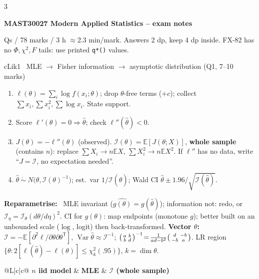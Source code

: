 \documentclass{article}
\newcommand{\h}[1]{{\bfseries #1}\ }
\newenvironment{steps}{\begin{enumerate}[label=\arabic*.,leftmargin=7pt,labelsep=1.2pt]}{\end{enumerate}}
\newcommand{\E}{\mathbb E}
\newcommand{\V}{\operatorname{Var}}
\newcommand{\I}{\mathcal I}
\newcommand{\tsp}{^{\mathsf T}}
\newcommand{\rc}[1]{\texttt{#1}}
\begin{document}
\fontsize{6.6}{7.15}\selectfont
\begin{multicols*}{3}

{\centering\bfseries\fontsize{7}{7.6}\selectfont MAST30027 Modern Applied Statistics -- exam notes\par}
{\centering\fontsize{5.6}{6.1} Qs / 78 marks / 3 h $\approx$2.3 min/mark. Answers 2 dp, keep 4 dp inside. FX-82 has no $\Phi,\chi^2,F$ tails: use printed \rc{q*()} values.\par}

\begin{tb}{cLik}{1 \textbullet\ MLE $\to$ Fisher information $\to$ asymptotic distribution (Q1, 7--10 marks)}
\begin{steps}
\item $\ell(\theta)=\sum_i\log f(x_i;\theta)$; drop $\theta$-free terms ($+c$); collect $\sum x_i,\sum x_i^2,\sum\log x_i$. State support.
\item Score $\ell'(\theta)=0\Rightarrow\hat\theta$; check $\ell''(\hat\theta)<0$.
\item $J(\theta)=-\ell''(\theta)$ (observed). $\I(\theta)=\E[J(\theta;X)]$, \textbf{whole sample} (contains $n$): replace $\sum X_i\to n\E X$, $\sum X_i^2\to n\E X^2$. If $\ell''$ has no data, write ``$J=\I$, no expectation needed''.
\item $\hat\theta\ \dot\sim\ N\big(\theta,\I(\theta)^{-1}\big)$; est.\ var $1/\I(\hat\theta)$; Wald CI $\hat\theta\pm1.96/\sqrt{\I(\hat\theta)}$.
\end{steps}
\h{Reparametrise:} MLE invariant ($\widehat{g(\theta)}=g(\hat\theta)$); information not: redo, or $\I_\eta=\I_\theta(d\theta/d\eta)^2$. CI for $g(\theta)$: map endpoints (monotone $g$); better built on an unbounded scale ($\log$, logit) then back-transformed.
\h{Vector $\theta$:} $\I=-\E[\partial^2\ell/\partial\theta\partial\theta\tsp]$, $\V\hat\theta\approx\I^{-1}$; $\begin{psmallmatrix}a&b\\b&d\end{psmallmatrix}^{-1}\!=\!\frac{1}{ad-b^2}\begin{psmallmatrix}d&-b\\-b&a\end{psmallmatrix}$. LR region $\{\theta:2[\ell(\hat\theta)-\ell(\theta)]\le\chi^2_k(.95)\}$, $k=\dim\theta$.\\[0.3pt]
\begin{tabularx}{\linewidth}{@{}L|c|c@{}}
\textbf{$n$ iid model} & \textbf{MLE} & \textbf{$\I$ (whole sample)}\\\hline

\end{tabularx}
\end{tb}
\end{multicols*}
\end{document}
